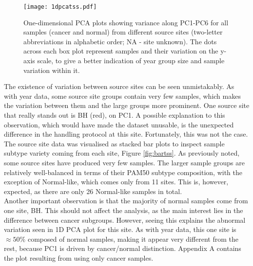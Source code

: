             
            \begin{figure}[!h]
            \centering
            \texttt{[image: 1dpcatss.pdf]}
            \caption[1D PCA plot based on sample source site data]{One-dimensional PCA plots showing variance along PC1-PC6 for all samples (cancer and normal) from different source sites (two-letter abbreviations in alphabetic order; NA - site unknown). The dots across each box plot represent samples and their variation on the y-axis scale, to give a better indication of year group size and sample variation within it.}
            \label{fig:1dpcatss}
            \end{figure}
            
            
  
    The existence of variation between source sites can be seen unmistakably. As with year data, some source site groups contain very few samples, which makes the variation between them and the large groups more prominent. One source site that really stands out is BH (red), on PC1. A possible explanation to this observation, which would have made the dataset unusable, is the unexpected difference in the handling protocol at this site. Fortunately, this was not the case.  \\
    

    The source site data was visualised as stacked bar plots to inspect sample subtype variety coming from each site, Figure \ref{fig:bartss}. As previously noted, some source sites have produced very few samples. The larger sample groups are relatively well-balanced in terms of their PAM50 subtype composition, with the exception of Normal-like, which comes only from 11 sites. This is, however, expected, as there are only 26 Normal-like samples in total. \\
    
    Another important observation is that the majority of normal samples come from one site, BH. This should not affect the analysis, as the main interest lies in the difference between cancer subgroups. However, seeing this explains the abnormal variation seen in 1D PCA plot for this site. As with year data, this one site is $\approx50\%$ composed of normal samples, making it appear very different from the rest, because PC1 is driven by cancer/normal distinction. Appendix A contains the plot resulting from using only cancer samples. 
  
    \newpage
    
